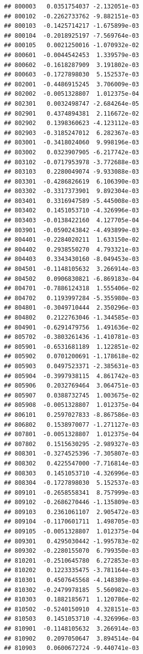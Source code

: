 \documentclass[ignorenonframetext,]{beamer}
\begin{document}
\begin{frame}[fragile]
\begin{verbatim}
## 800003   0.0351754037 -2.132051e-03
## 800102  -0.2262733762 -9.882151e-03
## 800103  -0.1425714217 -1.675899e-03
## 800104  -0.2018925197 -7.569764e-03
## 800105   0.0021250016 -1.070932e-02
## 800601  -0.0044542453  1.339579e-03
## 800602  -0.1618287909  3.191802e-03
## 800603  -0.1727898030  5.152537e-03
## 802001  -0.4486915245  3.706009e-03
## 802002  -0.0051328807  1.012375e-04
## 802301   0.0032498747 -2.684264e-05
## 802901   0.4374894381  2.116672e-02
## 802902   0.1398360623 -4.123112e-03
## 802903  -0.3185247012  6.282367e-03
## 803001  -0.3418024060  9.998196e-03
## 803002   0.0323907905 -6.217742e-03
## 803102  -0.0717953978 -3.772688e-03
## 803103   0.2280049074 -9.933088e-03
## 803301  -0.4286826619  6.106390e-03
## 803302  -0.3317373901  9.892304e-03
## 803401   0.3316947589 -5.445008e-03
## 803402   0.1451053710 -4.326996e-03
## 803403  -0.0138422160  4.127705e-04
## 803901  -0.0590243842 -4.493899e-03
## 804401  -0.2284020211  1.633150e-02
## 804402   0.2938550270  4.793321e-03
## 804403   0.3343430160 -8.049453e-03
## 804501  -0.1148105632  3.266914e-03
## 804502   0.0906830821 -6.869183e-04
## 804701  -0.7886124318  1.555406e-02
## 804702   0.1193997284 -5.355980e-03
## 804801  -0.3049710444  2.350296e-03
## 804802   0.2122763046 -1.344585e-03
## 804901  -0.6291479756  1.491636e-02
## 805702  -0.3803261436 -1.410781e-03
## 805901  -0.6531681189  1.122851e-02
## 805902   0.0701200691 -1.178618e-02
## 805903   0.0497523371 -2.385631e-03
## 805904  -0.3997938115  4.861742e-03
## 805906   0.2032769464  3.064751e-03
## 805907   0.0388732745  1.003675e-02
## 805908  -0.0051328807  1.012375e-04
## 806101   0.2597027833 -8.867586e-03
## 806802   0.1538970077 -1.271127e-03
## 807801  -0.0051328807  1.012375e-04
## 807802   0.1515630295 -2.989327e-03
## 808301  -0.3274525396 -7.305807e-03
## 808302   0.4225547000 -7.716814e-03
## 808303   0.1451053710 -4.326996e-03
## 808304  -0.1727898030  5.152537e-03
## 809101  -0.2658558341  8.757999e-03
## 809102  -0.2686270446 -1.135809e-03
## 809103   0.2361061107  2.905472e-03
## 809104  -0.1170601711  1.498705e-03
## 809105  -0.0051328807  1.012375e-04
## 809301   0.4295030442 -1.995783e-02
## 809302  -0.2280155070  6.799350e-03
## 810201  -0.2510645780  6.272853e-03
## 810202   0.1223335475 -3.781164e-03
## 810301   0.4507645568 -4.148389e-03
## 810302  -0.2479978185  5.560982e-03
## 810303   0.1882185671  1.120786e-02
## 810502  -0.5240150910  4.328151e-03
## 810503   0.1451053710 -4.326996e-03
## 810901  -0.1148105632  3.266914e-03
## 810902   0.2097050647  3.894514e-04
## 810903   0.0600672724 -9.440741e-03

\end{verbatim}
\end{frame}
\end{document}
